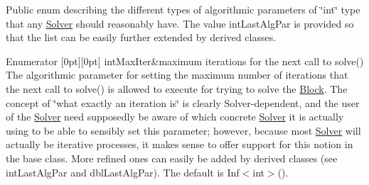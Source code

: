 Public enum describing the different types of algorithmic parameters of \char`\"{}int\char`\"{} type that any \mbox{\hyperlink{class_s_m_spp__di__unipi__it_1_1_solver}{Solver}} should reasonably have. The value int\+Last\+Alg\+Par is provided so that the list can be easily further extended by derived classes. \begin{DoxyEnumFields}{Enumerator}
[0pt][0pt]{}\mbox{\label{class_s_m_spp__di__unipi__it_1_1_solver_ac943b88bbfe5d261459af51eadcb5bb6a18fd973f71832c25b32393317e4d6eca}} 
int\+Max\+Iter&maximum iterations for the next call to solve() The algorithmic parameter for setting the maximum number of iterations that the next call to solve() is allowed to execute for trying to solve the \mbox{\hyperlink{class_s_m_spp__di__unipi__it_1_1_block}{Block}}. The concept of \char`\"{}what
exactly an iteration is\char`\"{} is clearly Solver-\/dependent, and the user of the \mbox{\hyperlink{class_s_m_spp__di__unipi__it_1_1_solver}{Solver}} need supposedly be aware of which concrete \mbox{\hyperlink{class_s_m_spp__di__unipi__it_1_1_solver}{Solver}} it is actually using to be able to sensibly set this parameter; however, because most \mbox{\hyperlink{class_s_m_spp__di__unipi__it_1_1_solver}{Solver}} will actually be iterative processes, it makes sense to offer support for this notion in the base class. More refined ones can easily be added by derived classes (see int\+Last\+Alg\+Par and dbl\+Last\+Alg\+Par). The default is Inf$<$int$>$(). \\
\hline


\end{DoxyEnumFields}
